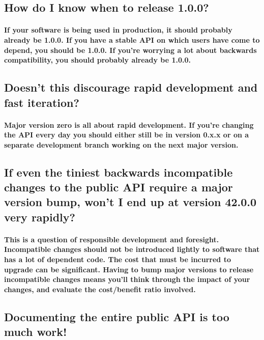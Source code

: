 \subsection{ How do I know when to release 1.0.0? }

\paragraph{
If your software is being used in production, it should probably already be 1.0.0. 
If you have a stable API on which users have come to depend, you should be 1.0.0. 
If you're worrying a lot about backwards compatibility, you should probably already be 1.0.0.
}

\subsection{ Doesn't this discourage rapid development and fast iteration? }

\paragraph{
Major version zero is all about rapid development. If you're changing the API 
every day you should either still be in version 0.x.x or on a separate development 
branch working on the next major version.
}

\subsection{ If even the tiniest backwards incompatible 
changes to the public API require a major version bump, won't I end 
up at version 42.0.0 very rapidly?
}

\paragraph{ 
This is a question of responsible development and foresight. Incompatible changes 
should not be introduced lightly to software that has a lot of dependent code. The 
cost that must be incurred to upgrade can be significant. Having to bump major 
versions to release incompatible changes means you'll think through the impact 
of your changes, and evaluate the cost/benefit ratio involved.
}

\subsection{ Documenting the entire public API is too much work! }

